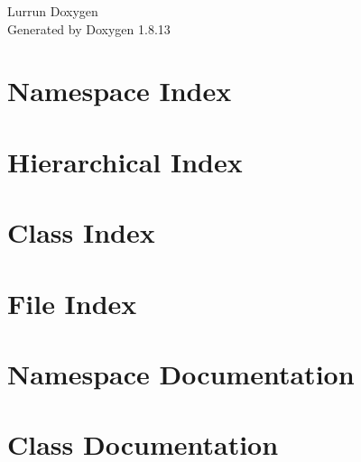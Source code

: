 \documentclass[twoside]{book}
\newcommand{\+}{\discretionary{\mbox{\scriptsize$\hookleftarrow$}}{}{}}
\newcommand{\clearemptydoublepage}{%
  \newpage{\pagestyle{empty}\cleardoublepage}%
}
\begin{document}
\hypersetup{pageanchor=false,
             bookmarksnumbered=true,
             pdfencoding=unicode
            }
\begin{titlepage}
\vspace*{7cm}
\begin{center}%
{\Large Lurrun Doxygen }\\
\vspace*{1cm}
{\large Generated by Doxygen 1.8.13}\\
\end{center}
\end{titlepage}
\clearemptydoublepage
{}
\tableofcontents
\clearemptydoublepage
{}
\hypersetup{pageanchor=true}

\chapter{Namespace Index}

\chapter{Hierarchical Index}

\chapter{Class Index}

\chapter{File Index}

\chapter{Namespace Documentation}








\chapter{Class Documentation}















\end{document}
